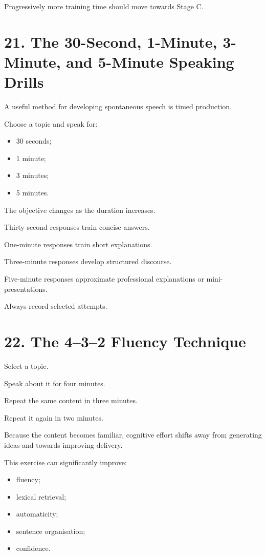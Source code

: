 Progressively more training time should move towards Stage C.

\section*{21. The 30-Second, 1-Minute, 3-Minute, and 5-Minute Speaking Drills}

A useful method for developing spontaneous speech is timed production.

Choose a topic and speak for:

\begin{itemize}
    \item 30 seconds;
    \item 1 minute;
    \item 3 minutes;
    \item 5 minutes.
\end{itemize}

The objective changes as the duration increases.

Thirty-second responses train concise answers.

One-minute responses train short explanations.

Three-minute responses develop structured discourse.

Five-minute responses approximate professional explanations or mini-presentations.

Always record selected attempts.

\section*{22. The 4--3--2 Fluency Technique}

Select a topic.

Speak about it for four minutes.

Repeat the same content in three minutes.

Repeat it again in two minutes.

Because the content becomes familiar, cognitive effort shifts away from generating ideas and towards improving delivery.

This exercise can significantly improve:

\begin{itemize}
    \item fluency;
    \item lexical retrieval;
    \item automaticity;
    \item sentence organisation;
    \item confidence.
\end{itemize}

